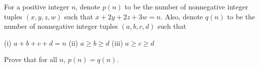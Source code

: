 For a positive integer $n$, denote $p(n)$ to be the number of nonnegative integer tuples $(x,y,z,w)$ such that $x+2y+2z+3w=n$. Also, denote $q(n)$ to be the number of nonnegative integer tuples $(a,b,c,d)$ such that

(i) $a+b+c+d=n$
(ii) $a \ge b \ge d$
(iii) $a \ge c \ge d$

Prove that for all $n$, $p(n) = q(n)$.